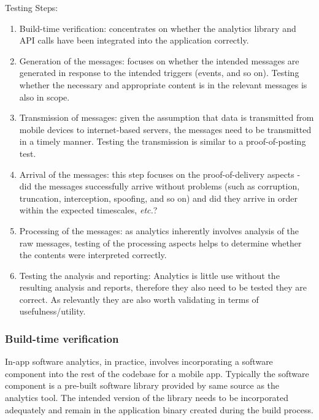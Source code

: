 Testing Steps:
\begin{enumerate}
    \item Build-time verification: concentrates on whether the analytics library and API calls have been integrated into the application correctly.
    \item Generation of the messages: focuses on whether the intended messages are generated in response to the intended triggers (events, and so on). Testing whether the necessary and appropriate content is in the relevant messages is also in scope. 
    \item Transmission of messages: given the assumption that data is transmitted from mobile devices to internet-based servers, the messages need to be transmitted in a timely manner. Testing the transmission is similar to a proof-of-posting test. 
    \item Arrival of the messages: this step focuses on the proof-of-delivery aspects - did the messages successfully arrive without problems (such as corruption, truncation, interception, spoofing, and so on) and did they arrive in order within the expected timescales, \emph{etc.}? 
    \item Processing of the messages: as analytics inherently involves analysis of the raw messages, testing of the processing aspects helps to determine whether the contents were interpreted correctly. 
    \item Testing the analysis and reporting: Analytics is little use without the resulting analysis and reports, therefore they also need to be tested they are correct. As relevantly they are also worth validating in terms of usefulness/utility. 
\end{enumerate}

\subsubsection{Build-time verification} 
In-app software analytics, in practice, involves incorporating a software component into the rest of the codebase for a mobile app. Typically the software component is a pre-built software library provided by same source as the analytics tool. The intended version of the library needs to be incorporated adequately and remain in the application binary created during the build process.

